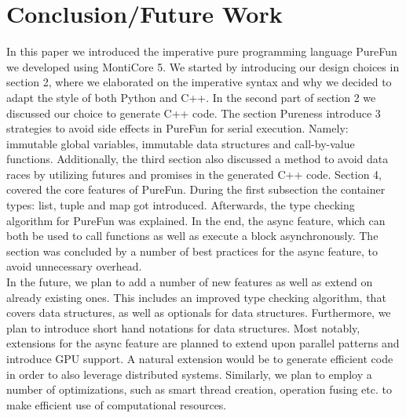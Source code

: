 \section{Conclusion/Future Work}
In this paper we introduced the imperative pure programming language PureFun we developed using MontiCore 5. We started by introducing our design choices in section 2, where we elaborated on the imperative syntax and why we decided to adapt the style of both Python and C++. In the second part of section 2 we discussed our choice to generate C++ code. The section Pureness introduce 3 strategies to avoid side effects in PureFun for serial execution. Namely: immutable global variables, immutable data structures and call-by-value functions. Additionally, the third section also discussed a method to avoid data races by utilizing futures and promises in the generated C++ code. Section 4, covered the core features of PureFun. During the first subsection the container types: list, tuple and map got introduced. Afterwards, the type checking algorithm for PureFun was explained. In the end, the async feature, which can both be used to call functions as well as execute a block asynchronously. The section was concluded by a number of best practices for the async feature, to avoid unnecessary overhead.\\
In the future, we plan to add a number of new features as well as extend on already existing ones. This includes an improved type checking algorithm, that covers data structures, as well as optionals for data structures. Furthermore, we plan to introduce short hand notations for data structures. Most notably, extensions for the async feature are planned to extend upon parallel patterns and introduce GPU support.
A natural extension would be to generate efficient code in order to also leverage distributed systems. Similarly, we plan to employ a number of optimizations, such as smart thread creation, operation fusing etc. to make efficient use of computational resources.